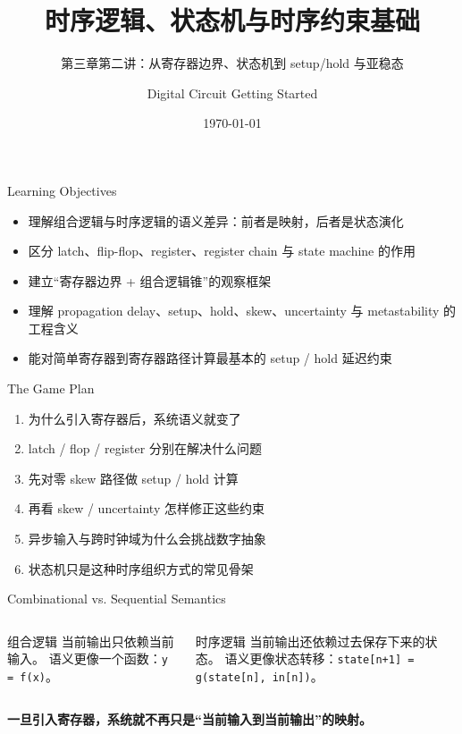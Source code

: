 \documentclass[aspectratio=169]{beamer}
\title{时序逻辑、状态机与时序约束基础}
\subtitle{第三章第二讲：从寄存器边界、状态机到 setup/hold 与亚稳态}
\author{Digital Circuit Getting Started}
\date{\today}
\begin{document}
\begin{frame}
  \titlepage
\end{frame}

\begin{frame}{Learning Objectives}
\begin{itemize}
  \item 理解组合逻辑与时序逻辑的语义差异：前者是映射，后者是状态演化
  \item 区分 latch、flip-flop、register、register chain 与 state machine 的作用
  \item 建立“寄存器边界 + 组合逻辑锥”的观察框架
  \item 理解 propagation delay、setup、hold、skew、uncertainty 与 metastability 的工程含义
  \item 能对简单寄存器到寄存器路径计算最基本的 setup / hold 延迟约束
\end{itemize}
\end{frame}

\begin{frame}{The Game Plan}
\begin{enumerate}
  \item 为什么引入寄存器后，系统语义就变了
  \item latch / flop / register 分别在解决什么问题
  \item 先对零 skew 路径做 setup / hold 计算
  \item 再看 skew / uncertainty 怎样修正这些约束
  \item 异步输入与跨时钟域为什么会挑战数字抽象
  \item 状态机只是这种时序组织方式的常见骨架
\end{enumerate}
\end{frame}

\begin{frame}{Combinational vs. Sequential Semantics}
\begin{columns}[T]
  \begin{block}{组合逻辑}
  \small
  当前输出只依赖当前输入。\newline
  语义更像一个函数：\texttt{y = f(x)}。
  \end{block}

  \begin{block}{时序逻辑}
  \small
  当前输出还依赖过去保存下来的状态。\newline
  语义更像状态转移：\texttt{state[n+1] = g(state[n], in[n])}。
  \end{block}
\end{columns}

\vspace{0.7em}
\textbf{一旦引入寄存器，系统就不再只是“当前输入到当前输出”的映射。}
\end{frame}
\end{document}
